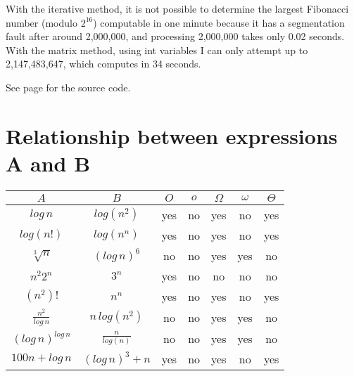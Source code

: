 \documentclass[11pt]{article}
\begin{document}
With the iterative method, it is not possible to determine the largest Fibonacci number (modulo $2^{16}$) computable in one minute because it has a segmentation fault after around 2,000,000, and processing 2,000,000 takes only 0.02 seconds. \\
With the matrix method, using int variables I can only attempt up to 2,147,483,647, which computes in 34 seconds.

See page \pageref{fibcode} for the source code.

\section{Relationship between expressions A and B}
\begin{tabular}{c c | c | c | c | c | c } 
$A$ & $B$ & $O$ & $o$ & $\Omega$ & $\omega$ & $\Theta$ \\ \hline
$log\,n$ & $log(n^{2})$ & yes & no & yes & no & yes \\ \hline
$log(n!)$ & $log(n^{n})$ & yes & no & yes & no & yes \\ \hline
$\sqrt[3]{n}$ & $(log\,n)^{6}$ & no & no & yes & yes & no \\ \hline
$n^{2}2^{n}$ & $3^{n}$ & yes & no & no & no & no \\ \hline
$(n^{2})!$ & $n^{n}$ & yes & no & yes & no & yes \\ \hline
$\frac {n^{2}}{log\,n}$ & $n\,log(n^{2})$ & no & no & yes & yes & no \\ \hline
$(log\,n)^{log\,n}$ & $\frac {n}{log(n)}$ & no & no & yes & yes & no \\ \hline
$100n + log\,n$ & $(log\,n)^{3} + n$ & yes & no & yes & no & yes \\ \hline
\end{tabular}

\newpage
\end{document}
